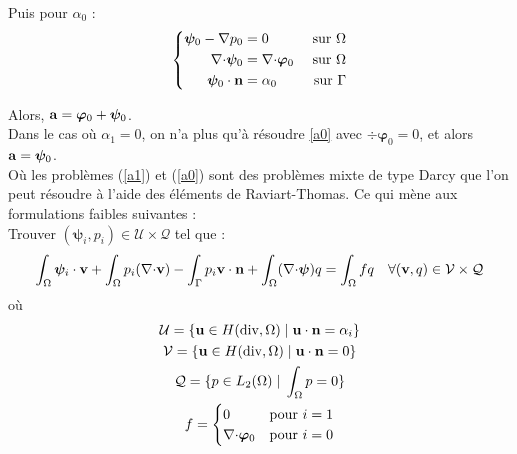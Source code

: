\documentclass[a4paper,11pt]{article}
\begin{document}
Puis pour $\alpha_0$ :
\begin{equation}\label{a0}
  \left\{
  \begin{aligned}
    \bm{\psi}_0 - {\nabla} p_0 &= 0 &\mbox{ sur }\Omega\\
    {\nabla\cdot}\bm{\psi}_0 &= {\nabla\cdot}\bm{\varphi}_0 &\mbox{ sur }\Omega\\
    \bm{\psi}_0\cdot{\mathbf{n}} &= \alpha_0 &\mbox{ sur }\Gamma
  \end{aligned}
  \right.
\end{equation}

Alors, ${\mathbf{a}}=\bm{\varphi}_0+\bm{\psi}_0$.\\

Dans le cas où $\alpha_1=0$, on n'a plus qu'à résoudre \ref{a0} avec $\div\bm{\varphi}_0=0$, et alors ${\mathbf{a}}=\bm{\psi}_0$.\\

Où les problèmes (\ref{a1}) et (\ref{a0}) sont des problèmes mixte de type Darcy que l'on peut résoudre à l'aide des éléments de Raviart-Thomas. Ce qui mène aux formulations faibles suivantes :\\
Trouver $(\bm{\psi}_i,p_i)\in \mathcal{U}\times\mathcal{Q}$ tel que :
\begin{equation}
  \int_\Omega\bm{\psi}_i\cdot{\mathbf{v}} + \int_\Omega p_i({\nabla\cdot}{\mathbf{v}}) - \int_\Gamma p_i{\mathbf{v}}\cdot{\mathbf{n}} + \int_\Omega ({\nabla\cdot}\bm{\psi})q = \int_\Omega fq \quad \forall ({\mathbf{v}},q)\in \mathcal{V}\times\mathcal{Q}
\end{equation}
où
\begin{gather*}
  \mathcal{U} = \{{\mathbf{u}}\in H(\mathrm{div},\Omega) \;|\; {\mathbf{u}}\cdot{\mathbf{n}} = \alpha_i\}\\
  \mathcal{V} = \{{\mathbf{u}}\in H(\mathrm{div},\Omega) \;|\; {\mathbf{u}}\cdot{\mathbf{n}} = 0\}\\
  \mathcal{Q} = \{p\in L_2(\Omega) \;|\; \int_\Omega p = 0 \}\\
  f=\begin{cases}
    0 &\mbox{pour } i=1\\
    {\nabla\cdot}\bm{\varphi}_0 &\mbox{pour } i=0
  \end{cases}
\end{gather*}
\end{document}
